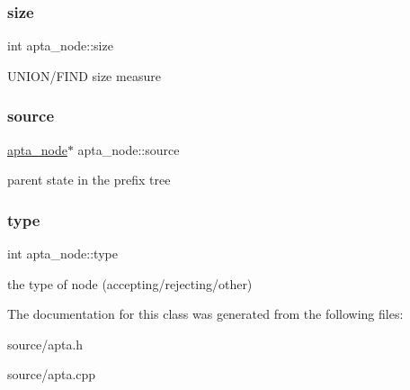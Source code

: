 \subsubsection{\texorpdfstring{size}{size}}
{\footnotesize\ttfamily int apta\+\_\+node\+::size}

U\+N\+I\+O\+N/\+F\+I\+ND size measure \mbox{\label{classapta__node_a3988cbceb4424c44507237241a430aa4}} 
\subsubsection{\texorpdfstring{source}{source}}
{\footnotesize\ttfamily \hyperlink{classapta__node}{apta\+\_\+node}$\ast$ apta\+\_\+node\+::source}

parent state in the prefix tree \mbox{\label{classapta__node_a9c1cf7c316ab485ff4435f90dda2766e}} 
\subsubsection{\texorpdfstring{type}{type}}
{\footnotesize\ttfamily int apta\+\_\+node\+::type}

the type of node (accepting/rejecting/other) 

The documentation for this class was generated from the following files\+:\begin{DoxyCompactItemize}
\item 
source/apta.\+h\item 
source/apta.\+cpp\end{DoxyCompactItemize}
